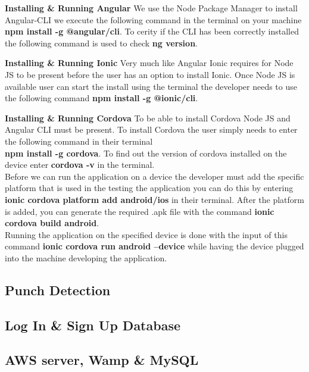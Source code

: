 \documentclass[a4paper,12pt]{report}
\begin{document}
\textbf{Installing \& Running Angular}
We use the Node Package Manager to install Angular-CLI we execute the following command in the terminal on your machine \textbf{npm install -g @angular/cli}. To cerity if the CLI has been correctly installed the following command is used to check \textbf{ng version}.

\textbf{Installing \& Running Ionic }
Very much like Angular Ionic requires for Node JS to be present before the user has an option to install Ionic.
Once Node JS is available user can start the install using the terminal the developer needs to use the following command \textbf{npm install -g @ionic/cli}.

\textbf{Installing \& Running Cordova }
To be able to install Cordova Node JS and Angular CLI must be present. To install Cordova the user simply needs to enter the following command in their terminal\\ \textbf{npm install -g cordova}. To find out the version of cordova installed on the device enter \textbf{cordova -v} in the terminal.\cite{cordova}\\

Before we can run the application on a device the developer must add the specific platform that is used in the testing the application you can do this by entering\\ \textbf{ionic cordova platform add android/ios} in their terminal.
After the platform is added, you can generate the required .apk file with the command  \textbf{ionic cordova build android}.\\

Running the application on the specified device is done with the input of this command \textbf{ionic cordova run android --device} while having the device plugged into the machine developing the application. \cite{cordovaRun}

\subsection{Punch Detection}

\subsection{Log In \& Sign Up Database}

\subsection{AWS server, Wamp \& MySQL}
\end{document}
